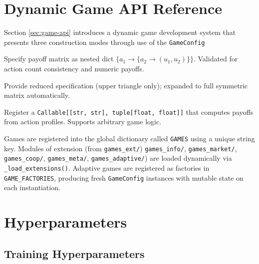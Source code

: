 
\section{Dynamic Game API Reference}
\label{app:api}

Section \ref{sec:game-api} introduces a dynamic game development system that presents three construction modes through use of the \texttt{GameConfig}

\begin{description}[nosep]
\item[Matrix.] Specify payoff matrix as nested dict
  $\{a_1 \to \{a_2 \to (u_1, u_2)\}\}$. Validated for action count
  consistency and numeric payoffs.
\item[Symmetric.] Provide reduced specification (upper triangle only);
  expanded to full symmetric matrix automatically.
\item[Custom.] Register a \texttt{Callable[[str, str], tuple[float, float]]}
  that computes payoffs from action profiles. Supports arbitrary game logic.
\end{description}

Games are registered into the global dictionary called \texttt{GAMES} using a unique string key. Modules of extension (from \texttt{games_ext/})
\texttt{games\_info/}, \texttt{games\_market/}, \texttt{games\_coop/},
\texttt{games\_meta/}, \texttt{games\_adaptive/}) are loaded dynamically
via \texttt{\_load\_extensions()}. Adaptive games are registered as
factories in \texttt{GAME\_FACTORIES}, producing fresh \texttt{GameConfig}
instances with mutable state on each instantiation.

\section{Hyperparameters}
\label{app:hyperparams}

\subsection{Training Hyperparameters}

